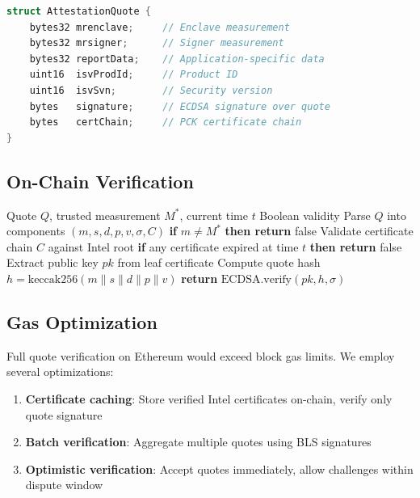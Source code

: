 \documentclass[11pt,a4paper]{article}
\theoremstyle{definition}
\begin{document}
\begin{lstlisting}[language=C,basicstyle=\ttfamily\small]
struct AttestationQuote {
    bytes32 mrenclave;     // Enclave measurement
    bytes32 mrsigner;      // Signer measurement
    bytes32 reportData;    // Application-specific data
    uint16  isvProdId;     // Product ID
    uint16  isvSvn;        // Security version
    bytes   signature;     // ECDSA signature over quote
    bytes   certChain;     // PCK certificate chain
}
\end{lstlisting}

\subsection{On-Chain Verification}

\begin{algorithm}
\caption{On-Chain Quote Verification}
\begin{algorithmic}[1]
\Require Quote $Q$, trusted measurement $M^*$, current time $t$
\Ensure Boolean validity
\State Parse $Q$ into components $(m, s, d, p, v, \sigma, C)$
\State \textbf{if} $m \neq M^*$ \textbf{then return} false 
\State Validate certificate chain $C$ against Intel root
\State \textbf{if} any certificate expired at time $t$ \textbf{then return} false
\State Extract public key $pk$ from leaf certificate
\State Compute quote hash $h = \text{keccak256}(m \| s \| d \| p \| v)$
\State \textbf{return} $\text{ECDSA.verify}(pk, h, \sigma)$
\end{algorithmic}
\end{algorithm}

\subsection{Gas Optimization}

Full quote verification on Ethereum would exceed block gas limits. We employ several optimizations:

\begin{enumerate}
    \item \textbf{Certificate caching}: Store verified Intel certificates on-chain, verify only quote signature
    \item \textbf{Batch verification}: Aggregate multiple quotes using BLS signatures
    \item \textbf{Optimistic verification}: Accept quotes immediately, allow challenges within dispute window
\end{enumerate}
\end{document}

